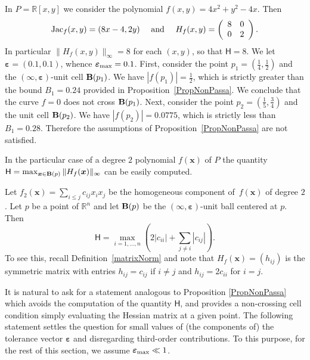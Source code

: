 \documentclass[10pt]{article}
\newcommand{\x}{{\bm x}}
\newcommand\R{{\mathbb R}}
\newcommand{\epsbold}{{\bm \varepsilon}}
\def\Jac{\mathop{\rm Jac}\nolimits}
\newtheorem{examp}[theorem]{Example}
\newenvironment{example*}{\begin{examp}\em}{\end{examp}}
\begin{document}
\begin{example*}\label{ex1}
In $P=\R[x,y]$ we consider the polynomial $f(x,y) =4x^2+y^2-4x$.
Then
\begin{eqnarray*}
\Jac_f(x,y)= (8x-4, 2y) \quad \textrm{ and } \quad 
H_f(x,y)=\left ( \begin{array}{ll}
8 & 0\\
0 & 2
\end{array}\right). 
\end{eqnarray*}
In particular $\|H_f(x,y)\|_\infty = 8$ for each $(x,y)$, so that  ${\mathsf H}=8$.
We let $\epsbold=(0.1,0.1)$, whence $\epsbold_{\rm max}=0.1$. 
First, consider the point $p_1=(\frac{1}{4}, \frac{1}{2})$ and 
the $(\infty,\epsbold)$-unit cell  $ {\bf B}(p_1)$.
We have $|f(p_1)|=\frac{1}{2}$, which is strictly greater than  
 the bound $B_1 = 0.24$ provided in Proposition~\ref{PropNonPassa}. 
We conclude that the curve $f=0$ does not cross ${\bf B}(p_1)$.
Next,   consider the point $p_2=(\frac{1}{5}, \frac{3}{4})$ and the unit cell  ${\bf B}(p_2)$.
We have $|f(p_2)|=0.0775$, which is strictly less than
$B_1 = 0.28$. Therefore  the assumptions of Proposition~\ref{PropNonPassa}  are not satisfied. 
\end{example*}



 \begin{example*}\label{Exgamma}
In the particular case of a degree $2$ polynomial $f(\x)$ of $P$
the quantity ${\mathsf H}= \max_{\x \in {\bf B}(p)} \|H_f(\bm x)\|_\infty$ can be easily computed.

Let  $f_2(\x)=\sum_{i \le j}c_{ij} x_ix_j$  be the homogeneous 
component of~$f(\x)$ of degree $2$.
Let $p$ be a point of $\R^n$ and let
$ {\bf B}(p)$
be the $(\infty,\epsbold)$-unit ball  centered at $p$.
Then 
$$
{\mathsf H}=\max_{i=1, \ldots, n} \left (2 |c_{ii}| +
 \sum_{j \neq i} |c_{ij}| \right).
$$
To see this, recall  Definition~\ref{matrixNorm} and note that 
$H_f(\bm x)=(h_{ij})$ is the symmetric matrix with entries $h_{ij}=c_{ij}$ if $i\neq j$ and $h_{ij}=2c_{ii}$ for $i=j$.
\end{example*}

\smallskip



It is natural to ask for a statement analogous  to Proposition \ref{PropNonPassa} which  avoids the computation of   the quantity ${\mathsf H}$,  and provides  a  non-crossing cell condition simply  evaluating  the Hessian matrix at a  given point.  The following statement settles the question  for small values of (the components of) the tolerance vector $\epsbold$ and disregarding  third-order contributions. 
To this purpose, for the rest of this section, we assume $\epsbold_{\rm max}\ll 1$.
\end{document}
